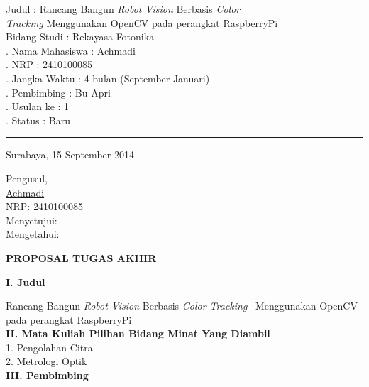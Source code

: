 \documentclass[a4paper,12pt]{article}
\begin{document}
\noindent Judul \hspace{80pt} : Rancang Bangun \textit{Robot Vision} Berbasis \textit{Color} \\[5pt]
\textit{Tracking} Menggunakan OpenCV pada perangkat RaspberryPi \\[5pt]
\noindent Bidang Studi \hspace{42pt} : Rekayasa Fotonika\\[5pt]
. Nama Mahasiswa \hspace{5pt} : Achmadi\\[5pt]
. NRP  \hspace{70pt} : 2410100085\\[5pt]
. Jangka Waktu \hspace{20pt} : 4 bulan (September-Januari)\\[5pt]
. Pembimbing \hspace{28pt} : Bu Apri\\[5pt]
. Usulan ke \hspace{40pt} : 1\\[5pt]
. Status \hspace{60pt} : Baru\\[5pt]
\rule{385pt}{5pt}
\begin{flushright}
  Surabaya, 15 September 2014
\end{flushright}
\begin{center}
 Pengusul,
 \\[40pt]
 \underline{Achmadi}\\
 NRP: 2410100085
 \\[40pt]
 Menyetujui:
 \\[100pt]
 Mengetahui:\\
\end{center}
\newpage
\begin{center}
 \textbf{PROPOSAL TUGAS AKHIR}
\end{center}
\noindent \textbf{I. \hspace{10pt} Judul}

Rancang Bangun \textit{Robot Vision} Berbasis \textit{Color Tracking} \ Menggunakan OpenCV pada perangkat RaspberryPi
\\[10pt]
\noindent \textbf{II. \hspace{9pt} Mata Kuliah Pilihan Bidang Minat Yang Diambil}\\
1. Pengolahan Citra\\
2. Metrologi Optik
\\[10pt]
\noindent \textbf{III. \hspace{8pt} Pembimbing}
\end{document}
